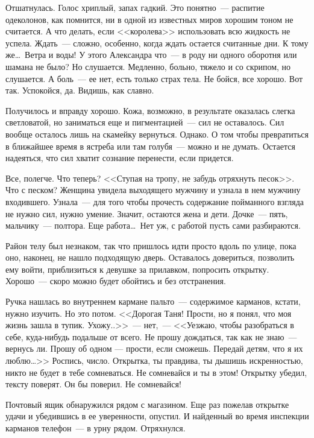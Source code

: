Отшатнулась. Голос хриплый, запах гадкий. Это понятно~--- распитие одеколонов, 
как 
помнится, ни в одной из известных миров хорошим тоном не считается. А что 
делать, если <<королева>> использовать всю жидкость не успела. Ждать~--- 
сложно, 
особенно, когда ждать остается считанные дни. К тому же\ldots\ Ветра и воды! У этого 
Александра что~--- в роду ни одного оборотня или шамана не было? Но слушается. 
Медленно, больно, тяжело и со скрипом, но слушается. А боль~--- ее нет, есть 
только страх тела. Не бойся, все хорошо. Вот так. Успокойся, да. Видишь, как 
славно.

Получилось и вправду хорошо. Кожа, возможно, в результате оказалась слегка 
светловатой, но заниматься еще и пигментацией~--- сил не оставалось. Сил вообще 
осталось лишь на скамейку вернуться. Однако. О том чтобы превратиться в 
ближайшее время в ястреба или там голубя~--- можно и не думать. Остается 
надеяться, что сил хватит сознание перенести, если придется.

Все, полегче. Что теперь? <<Ступая на тропу, не забудь отряхнуть песок>>. Что с 
песком? Женщина увидела выходящего мужчину и узнала в нем мужчину входившего. 
Узнала~--- для того чтобы прочесть содержание пойманного взгляда не нужно сил, 
нужно умение. Значит, остаются жена и дети. Дочке~--- пять, мальчику~--- 
полтора. 
Еще работа\ldots\ Нет уж, с работой пусть сами разбираются.

Район телу был незнаком, так что пришлось идти просто вдоль по улице, пока оно, 
наконец, не нашло подходящую дверь. Оставалось довериться, позволить ему войти, 
приблизиться к девушке за прилавком, попросить открытку. Хорошо~--- скоро можно 
будет обойтись и без отстранения.

Ручка нашлась во внутреннем кармане пальто~--- содержимое карманов, кстати, 
нужно 
изучить. Но это потом. <<Дорогая Таня! Прости, но я понял, что моя жизнь зашла в 
тупик. Ухожу..>>~--- нет,~--- <<Уезжаю, чтобы разобраться в себе, куда-нибудь 
подальше 
от всего. Не прошу дождаться, так как не знаю~--- вернусь ли. Прошу об одном 
--- 
прости, если сможешь. Передай детям, что я их люблю\ldots>> Роспись, число. 
Открытка, ты правдива, ты дышишь искренностью, никто не будет в тебе 
сомневаться. Не сомневайся и ты в этом! Открытку убедил, тексту поверят. Он бы 
поверил. Не сомневайся!

Почтовый ящик обнаружился рядом с магазином. Еще раз пожелав открытке удачи и 
убедившись в ее уверенности, опустил. И найденный во время инспекции карманов 
телефон~--- в урну рядом. Отряхнулся.

